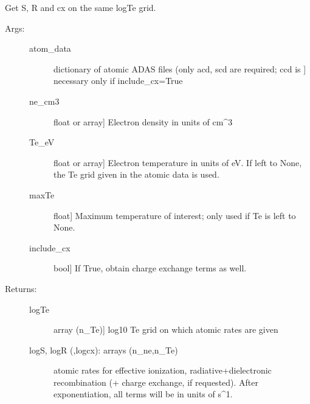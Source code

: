 \documentclass[letterpaper,10pt,english]{sphinxmanual}
\begin{document}
\begin{fulllineitems}
\label{\detokenize{aurora:aurora.atomic.get_cs_balance_terms}}
Get S, R and cx on the same logTe grid.
\begin{description}
\item[{Args:}] \leavevmode\begin{description}
\item[{atom\_data}] \leavevmode{[}dictionary of atomic ADAS files (only acd, scd are required; ccd is {]}
necessary only if include\_cx=True

\item[{ne\_cm3}] \leavevmode{[}float or array{]}
Electron density in units of cm\textasciicircum{}\sphinxhyphen{}3

\item[{Te\_eV}] \leavevmode{[}float or array{]}
Electron temperature in units of eV. If left to None, the Te grid
given in the atomic data is used.

\item[{maxTe}] \leavevmode{[}float{]}
Maximum temperature of interest; only used if Te is left to None.

\item[{include\_cx}] \leavevmode{[}bool{]}
If True, obtain charge exchange terms as well.

\end{description}

\item[{Returns:}] \leavevmode\begin{description}
\item[{logTe}] \leavevmode{[}array (n\_Te){]}
log10 Te grid on which atomic rates are given

\item[{logS, logR (,logcx): arrays (n\_ne,n\_Te)}] \leavevmode
atomic rates for effective ionization, radiative+dielectronic
recombination (+ charge exchange, if requested). After exponentiation, all terms
will be in units of s\textasciicircum{}\sphinxhyphen{}1.

\end{description}

\end{description}

\end{fulllineitems}
\end{document}
